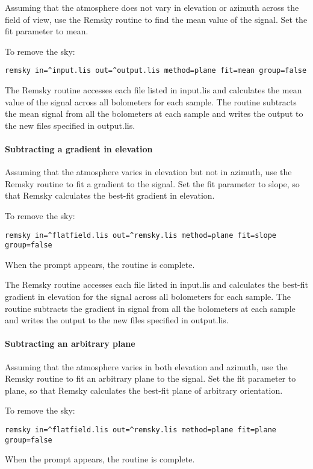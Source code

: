 \documentclass[twoside,11pt]{article}
\renewcommand{\_}{\texttt{\symbol{95}}}
\begin{document}
Assuming that the atmosphere does not vary in elevation or azimuth
across the field of view, use the Remsky routine to find the mean
value of the signal. Set the fit parameter to mean.

To remove the sky:
\begin{verbatim}
remsky in=^input.lis out=^output.lis method=plane fit=mean group=false
\end{verbatim}

The Remsky routine accesses each file listed in input.lis and
calculates the mean value of the signal across all bolometers for each
sample. The routine subtracts the mean signal from all the bolometers
at each sample and writes the output to the new files specified in
output.lis.

\paragraph{Subtracting a gradient in elevation}

Assuming that the atmosphere varies in elevation but not in azimuth,
use the Remsky routine to fit a gradient to the signal. Set the fit
parameter to slope, so that Remsky calculates the best-fit gradient in
elevation.

To remove the sky:
\begin{verbatim}
remsky in=^flatfield.lis out=^remsky.lis method=plane fit=slope group=false
\end{verbatim}
When the prompt appears, the routine is complete.

The Remsky routine accesses each file listed in input.lis and
calculates the best-fit gradient in elevation for the signal across
all bolometers for each sample.  The routine subtracts the gradient in
signal from all the bolometers at each sample and writes the output to
the new files specified in output.lis.

\paragraph{Subtracting an arbitrary plane}

Assuming that the atmosphere varies in both elevation and azimuth, use
the Remsky routine to fit an arbitrary plane to the signal. Set the
fit parameter to plane, so that Remsky calculates the best-fit plane
of arbitrary orientation.

To remove the sky:
\begin{verbatim}
remsky in=^flatfield.lis out=^remsky.lis method=plane fit=plane group=false
\end{verbatim}
When the prompt appears, the routine is complete.
\end{document}
